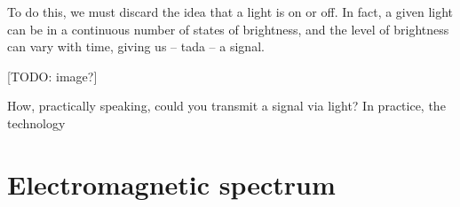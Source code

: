 \documentclass[UTF8]{book}
\begin{document}
\begin{CJK}{UTF8}{gbsn}
To do this, we must discard the idea that a light is on or off. In fact, a given light can be in a continuous number of states of brightness, and the level of brightness can vary with time, giving us -- tada -- a signal.

[TODO: image?]

How, practically speaking, could you transmit a signal via light? In practice, the technology

\chapter{Electromagnetic spectrum}






\end{CJK}
\end{document}
